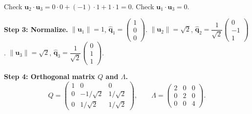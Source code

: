 \documentclass[12pt,a4paper]{article}
\begin{document}
Check $\mathbf{u}_2\cdot\mathbf{u}_3 = 0\cdot0+(-1)\cdot1+1\cdot1 = 0$. \checkmark \quad Check $\mathbf{u}_1\cdot\mathbf{u}_3 = 0$. \checkmark

\textbf{Step 3: Normalize.}
$\|\mathbf{u}_1\|=1$, $\hat{\mathbf{q}}_1=\begin{pmatrix}1\\0\\0\end{pmatrix}$.
$\|\mathbf{u}_2\|=\sqrt{2}$, $\hat{\mathbf{q}}_2=\dfrac{1}{\sqrt{2}}\begin{pmatrix}0\\-1\\1\end{pmatrix}$.
$\|\mathbf{u}_3\|=\sqrt{2}$, $\hat{\mathbf{q}}_3=\dfrac{1}{\sqrt{2}}\begin{pmatrix}0\\1\\1\end{pmatrix}$.

\textbf{Step 4: Orthogonal matrix $Q$ and $\Lambda$.}
\[
  Q = \begin{pmatrix}1&0&0\\0&-1/\sqrt{2}&1/\sqrt{2}\\0&1/\sqrt{2}&1/\sqrt{2}\end{pmatrix}, \qquad
  \Lambda = \begin{pmatrix}2&0&0\\0&2&0\\0&0&4\end{pmatrix}.
\]
\end{document}
